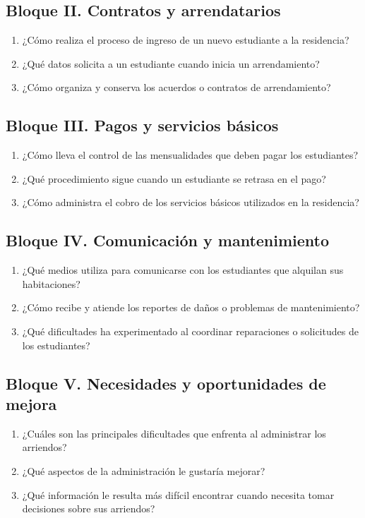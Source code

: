 \documentclass[12pt,a4paper]{article}
\begin{document}
\subsection{Bloque II. Contratos y arrendatarios}
\begin{enumerate}[label=\textbf{P\arabic*.},start=4,leftmargin=1.5cm]
\item ¿Cómo realiza el proceso de ingreso de un nuevo estudiante a la residencia?
\item ¿Qué datos solicita a un estudiante cuando inicia un arrendamiento?
\item ¿Cómo organiza y conserva los acuerdos o contratos de arrendamiento?
\end{enumerate}

\subsection{Bloque III. Pagos y servicios básicos}
\begin{enumerate}[label=\textbf{P\arabic*.},start=7,leftmargin=1.5cm]
\item ¿Cómo lleva el control de las mensualidades que deben pagar los estudiantes?
\item ¿Qué procedimiento sigue cuando un estudiante se retrasa en el pago?
\item ¿Cómo administra el cobro de los servicios básicos utilizados en la residencia?
\end{enumerate}

\subsection{Bloque IV. Comunicación y mantenimiento}
\begin{enumerate}[label=\textbf{P\arabic*.},start=10,leftmargin=1.5cm]
\item ¿Qué medios utiliza para comunicarse con los estudiantes que alquilan sus habitaciones?
\item ¿Cómo recibe y atiende los reportes de daños o problemas de mantenimiento?
\item ¿Qué dificultades ha experimentado al coordinar reparaciones o solicitudes de los estudiantes?
\end{enumerate}

\subsection{Bloque V. Necesidades y oportunidades de mejora}
\begin{enumerate}[label=\textbf{P\arabic*.},start=13,leftmargin=1.5cm]
\item ¿Cuáles son las principales dificultades que enfrenta al administrar los arriendos?
\item ¿Qué aspectos de la administración le gustaría mejorar?
\item ¿Qué información le resulta más difícil encontrar cuando necesita tomar decisiones sobre sus arriendos?
\end{enumerate}
\end{document}
